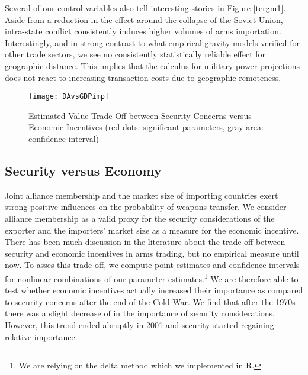 \documentclass[12pt, letterpaper]{article}
\numberwithin{equation}{section}
\begin{document}
Several of our control variables also tell interesting stories in Figure \ref{tergm1}. 
Aside from a reduction in the effect around the collapse of the Soviet Union, intra-state conflict consistently induces higher volumes of arms importation. Interestingly, and in strong contrast to what empirical gravity models verified for other trade sectors, we see no consistently statistically reliable effect for geographic distance. This implies that the calculus for military power projections does not react to increasing transaction costs due to geographic remoteness.


\renewcommand{\thefigure}{\arabic{figure}}
\begin{figure}[t]
\begin{center}
\texttt{[image: DAvsGDPimp]}
\caption{Estimated Value Trade-Off between Security Concerns versus Economic Incentives (red dots: significant parameters, gray area: confidence interval) }
\label{tradeoff}
\end{center}
\end{figure}

\subsection{Security versus Economy}

\noindent Joint alliance membership and the market size of importing countries exert strong positive influences on the probability of weapons transfer. We consider alliance membership as a valid proxy for the security considerations of the exporter and the importers' market size as a measure for the economic incentive. There has been much discussion in the literature about the trade-off between security and economic incentives in arms trading, but no empirical measure until now. To asses this trade-off, we compute point estimates and confidence intervals for nonlinear combinations of our parameter estimates.\footnote{We are relying on the delta method which we implemented in R.}
We are therefore able to test whether economic incentives actually increased their importance as compared to security concerns after the end of the Cold War. We find that after the 1970s there was a slight decrease of in the importance of security considerations. However, this trend ended abruptly in 2001 and security started regaining relative importance.  
\end{document}
